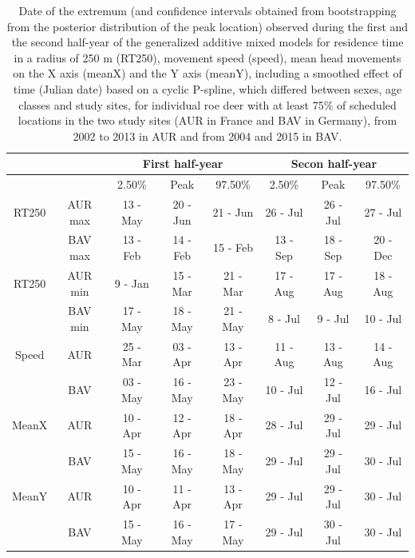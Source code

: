 \documentclass[a4paper,11pt]{article}
\begin{document}
\newpage
\begin{table}[ht]
  \centering
  \caption{Date of the extremum (and confidence intervals obtained from bootstrapping from the posterior distribution of the peak location) observed during the first and the second half-year of the generalized additive
    mixed models for residence time in a radius of 250 m (RT250),
    movement speed (speed), mean head movements on the X axis (meanX)
    and the Y axis (meanY), including a smoothed effect of time
    (Julian date) based on a cyclic P-spline, which differed between sexes, age classes and study sites, for individual roe deer with at least 75\% of scheduled locations in the two study sites (AUR in France and BAV in Germany), from 2002
    to 2013 in AUR and from 2004 and 2015 in BAV.}    \label{tab:peaks}
    
    \begin{tabular}{cccccccc}
    \\
    \hline
          &       & \multicolumn{3}{c}{First half-year} & \multicolumn{3}{c}{Secon half-year} \\
    \hline
          &       & 2.50\% & Peak  & 97.50\% & 2.50\% & Peak  & 97.50\% \\
    RT250 & AUR max   & 13 - May & 20 - Jun & 21 - Jun & 26 - Jul & 26 - Jul & 27 - Jul \\
          & BAV max   & 13 - Feb & 14 - Feb & 15 - Feb & 13 - Sep & 18 - Sep & 20 - Dec \\
    RT250 & AUR min  & 9 - Jan & 15 - Mar & 21 - Mar & 17 - Aug & 17 - Aug & 18 - Aug \\
          & BAV min  & 17 - May & 18 - May & 21 - May & 8 - Jul & 9 - Jul & 10 - Jul \\
    Speed & AUR   & 25 - Mar & 03 - Apr & 13 - Apr & 11 - Aug & 13 - Aug & 14 - Aug       \\
          & BAV   & 03 - May & 16 - May & 23 - May & 10 - Jul & 12 - Jul & 16 - Jul \\
    MeanX & AUR   & 10 - Apr & 12 - Apr & 18 - Apr & 28 - Jul & 29 - Jul & 29 - Jul \\
          & BAV   & 15 - May & 16 - May & 18 - May & 29 - Jul & 29 - Jul & 30 - Jul \\
    MeanY & AUR   & 10 - Apr & 11 - Apr & 13 - Apr & 29 - Jul & 29 - Jul & 30 - Jul \\
          & BAV   & 15 - May & 16 - May & 17 - May & 29 - Jul & 30 - Jul & 30 - Jul \\
    \hline
    \end{tabular}
\end{table}
\end{document}
